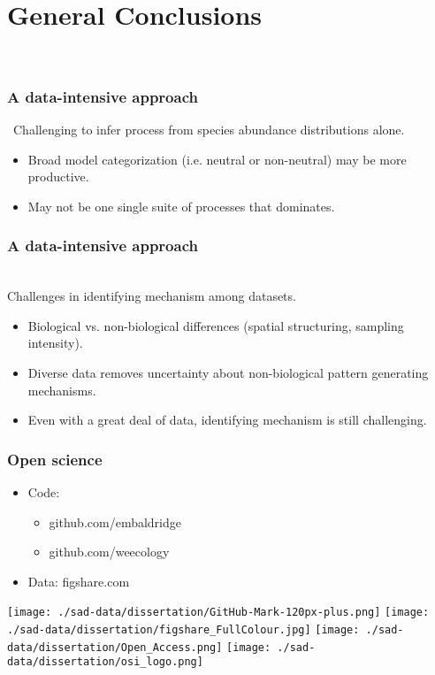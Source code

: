 \documentclass[14pt]{beamer}
\begin{document}
\section{General Conclusions}
\begin{frame}{}
~\\ 
\frametitle{A data-intensive approach}\
Challenging to infer process from species abundance distributions alone.
~\\ 
\begin{itemize}
\item Broad model categorization (i.e. neutral or non-neutral) may be more productive.
\item May not be one single suite of processes that dominates.
\end{itemize} 
\end{frame}

\begin{frame}[t]{}
\frametitle{A data-intensive approach}\
~\\ 
Challenges in identifying mechanism among datasets.
~\\ 
\begin{itemize}
\item Biological vs. non-biological differences (spatial structuring, sampling intensity).
\item Diverse data removes uncertainty about non-biological pattern generating mechanisms.
\item Even with a great deal of data, identifying mechanism is still challenging.
\end{itemize} 
\end{frame}


\begin{frame}
\frametitle{Open science}
\begin{itemize}
\item Code: 
\begin{itemize}
\item github.com/embaldridge
\item github.com/weecology
\end{itemize}
\item Data: figshare.com
\end{itemize}
\begin{center}
\texttt{[image: ./sad-data/dissertation/GitHub-Mark-120px-plus.png]}
\texttt{[image: ./sad-data/dissertation/figshare\_FullColour.jpg]} 
\texttt{[image: ./sad-data/dissertation/Open\_Access.png]}  
\texttt{[image: ./sad-data/dissertation/osi\_logo.png]}
\end{center}
\end{frame}
\end{document}
